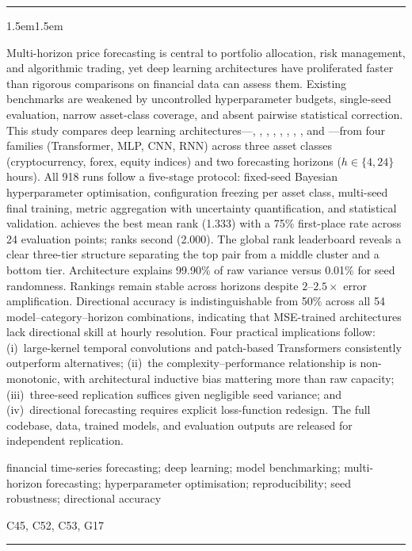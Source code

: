 \documentclass[12pt, a4paper]{article}
\renewenvironment{abstract}{%
  \vspace{0.8em}%
  \noindent\rule{\textwidth}{0.6pt}%
  \vspace{0.4em}%
  \begin{adjustwidth}{1.5em}{1.5em}%
  \small%
  \noindent{\sffamily\bfseries Abstract.}\quad\ignorespaces
}{%
  \end{adjustwidth}%
  \vspace{0.4em}%
  \noindent\rule{\textwidth}{0.6pt}%
  \vspace{1.2em}%
}
\begin{document}
\begin{abstract}
Multi-horizon price forecasting is central to portfolio allocation, risk management, and algorithmic trading, yet deep learning architectures have proliferated faster than rigorous comparisons on financial data can assess them. Existing benchmarks are weakened by uncontrolled hyperparameter budgets, single-seed evaluation, narrow asset-class coverage, and absent pairwise statistical correction. This study compares \nmodels deep learning architectures---\autoformer, \dlinear, \itransformer, \lstm, \moderntcn, \nhits, \patchtst, \timesnet, and \timexer---from four families (Transformer, MLP, CNN, RNN) across three asset classes (cryptocurrency, forex, equity indices) and two forecasting horizons ($h \in \{4, 24\}$ hours). All 918 runs follow a five-stage protocol: fixed-seed Bayesian hyperparameter optimisation, configuration freezing per asset class, multi-seed final training, metric aggregation with uncertainty quantification, and statistical validation. \moderntcn achieves the best mean rank (1.333) with a 75\% first-place rate across 24 evaluation points; \patchtst ranks second (2.000). The global rank leaderboard reveals a clear three-tier structure separating the top pair from a middle cluster and a bottom tier. Architecture explains 99.90\% of raw \rmse variance versus 0.01\% for seed randomness. Rankings remain stable across horizons despite $2$--$2.5\times$ error amplification. Directional accuracy is indistinguishable from 50\% across all 54 model--category--horizon combinations, indicating that MSE-trained architectures lack directional skill at hourly resolution. Four practical implications follow: (i)~large-kernel temporal convolutions and patch-based Transformers consistently outperform alternatives; (ii)~the complexity--performance relationship is non-monotonic, with architectural inductive bias mattering more than raw capacity; (iii)~three-seed replication suffices given negligible seed variance; and (iv)~directional forecasting requires explicit loss-function redesign. The full codebase, data, trained models, and evaluation outputs are released for independent replication.

\medskip
{} financial time-series forecasting; deep learning; model benchmarking; multi-horizon forecasting; hyperparameter optimisation; reproducibility; seed robustness; directional accuracy

\smallskip
{} C45, C52, C53, G17
\end{abstract}
\clearpage
\end{document}
